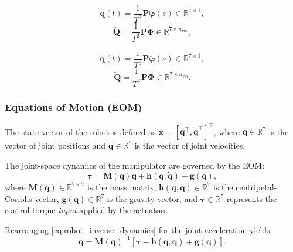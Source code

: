 \begin{equation}
    \ddot{\mathbf{q}}(t) = \frac{1}{T^2} \mathbf{P}\ddot{\boldsymbol{\varphi}}(s) \in \mathbb{R}^{7 \times 1},
\label{eq_jointdd_vec_bspline}
\end{equation}
\begin{equation}
    \ddot{\mathbf{Q}} = \frac{1}{T^2} \mathbf{P}\ddot{\boldsymbol{\Phi}} \in \mathbb{R}^{7 \times n_{\text{via}}},
\label{eq_jointdd_mat_bspline}
\end{equation}

\begin{equation}
    \dddot{\mathbf{q}}(t) = \frac{1}{T^3} \mathbf{P}\dddot{\boldsymbol{\varphi}}(s) \in \mathbb{R}^{7 \times 1},
\label{eq_jointddd_vec_bspline}
\end{equation}
\begin{equation}
    \dddot{\mathbf{Q}} = \frac{1}{T^3} \mathbf{P}\dddot{\boldsymbol{\Phi}} \in \mathbb{R}^{7 \times n_{\text{via}}}.
\label{eq_jointddd_mat_bspline}
\end{equation}

\subsubsection{Equations of Motion (EOM)}
The state vector of the robot is defined as $\mathbf{x} = [\mathbf{q}^\top, \dot{\mathbf{q}}^\top]^\top$,
where $\mathbf{q} \in \mathbb{R}^7$ is the vector of joint positions and $\dot{\mathbf{q}} \in \mathbb{R}^7$ is the vector of joint velocities.

The joint-space dynamics of the manipulator are governed by the \ac{EOM}:
\begin{equation}
    \boldsymbol{\tau} = \mathbf{M}(\mathbf{q})\ddot{\mathbf{q}} + \mathbf{h}(\mathbf{q},\dot{\mathbf{q}}) - \mathbf{g}(\mathbf{q}),
    \label{eq:robot_inverse_dynamics}
\end{equation}
where $\mathbf{M}(\mathbf{q}) \in \mathbb{R}^{7\times7}$ is the mass matrix, $\mathbf{h}(\mathbf{q},\dot{\mathbf{q}}) \in \mathbb{R}^7$ is the centripetal-Coriolis vector, $\mathbf{g}(\mathbf{q}) \in \mathbb{R}^7$ is the gravity vector, and $\boldsymbol{\tau} \in \mathbb{R}^7$ represents the control torque \emph{input} applied by the actuators.

Rearranging \eqref{eq:robot_inverse_dynamics} for the joint acceleration yields:
\begin{equation}
    \ddot{\mathbf{q}} = \mathbf{M}(\mathbf{q})^{-1} \left[ \boldsymbol{\tau} - \mathbf{h}(\mathbf{q},\dot{\mathbf{q}}) + \mathbf{g}(\mathbf{q}) \right].
    \label{eq:robot_acceleration_from_torque}
\end{equation}

